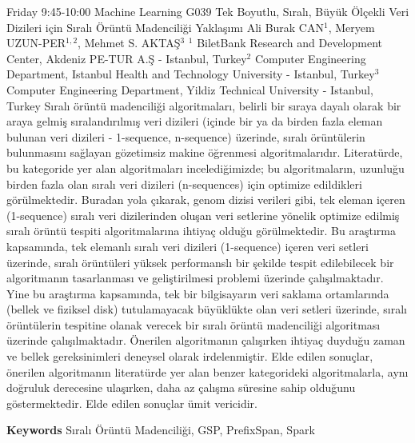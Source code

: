 
    \begin{abstract_basarim}
    {Friday 9:45-10:00}
    {Machine Learning}
    {G039}
    {Tek Boyutlu, Sıralı, Büyük Ölçekli Veri Dizileri için Sıralı Örüntü Madenciliği Yaklaşımı}
    {%
    Ali Burak CAN$^{1}$, Meryem UZUN-PER$^{1,2}$, Mehmet S. AKTAŞ$^{3}$}
    {%
    }
    {%
    $^1$ BiletBank Research and Development Center, Akdeniz PE-TUR A.Ş - Istanbul, Turkey\newline{}$^2$ Computer Engineering Department, Istanbul Health and Technology University - Istanbul, Turkey\newline{}$^3$ Computer Engineering Department, Yildiz Technical University - Istanbul, Turkey}
    Sıralı örüntü madenciliği algoritmaları, belirli bir sıraya dayalı olarak bir araya gelmiş sıralandırılmış veri dizileri (içinde bir ya da birden fazla eleman bulunan veri dizileri - 1-sequence, n-sequence) üzerinde, sıralı örüntülerin bulunmasını sağlayan gözetimsiz makine öğrenmesi algoritmalarıdır. Literatürde, bu kategoride yer alan algoritmaları incelediğimizde; bu algoritmaların, uzunluğu birden fazla olan sıralı veri dizileri (n-sequences) için optimize edildikleri görülmektedir. Buradan yola çıkarak, genom dizisi verileri gibi, tek eleman içeren (1-sequence) sıralı veri dizilerinden oluşan veri setlerine yönelik optimize edilmiş sıralı örüntü tespiti algoritmalarına ihtiyaç olduğu görülmektedir. Bu araştırma kapsamında, tek elemanlı sıralı veri dizileri (1-sequence) içeren veri setleri üzerinde, sıralı örüntüleri yüksek performanslı bir şekilde tespit edilebilecek bir algoritmanın tasarlanması ve geliştirilmesi problemi üzerinde çalışılmaktadır. Yine bu araştırma kapsamında, tek bir bilgisayarın veri saklama ortamlarında (bellek ve fiziksel disk) tutulamayacak büyüklükte olan veri setleri üzerinde, sıralı örüntülerin tespitine olanak verecek bir sıralı örüntü madenciliği algoritması üzerinde çalışılmaktadır. Önerilen algoritmanın çalışırken ihtiyaç duyduğu zaman ve bellek gereksinimleri deneysel olarak irdelenmiştir. Elde edilen sonuçlar, önerilen algoritmanın literatürde yer alan benzer kategorideki algoritmalarla, aynı doğruluk derecesine ulaşırken, daha az çalışma süresine sahip olduğunu göstermektedir. Elde edilen sonuçlar ümit vericidir. 
    
        \textbf{Keywords} \newline{}Sıralı Örüntü Madenciliği, GSP, PrefixSpan, Spark
    \end{abstract_basarim}
    
